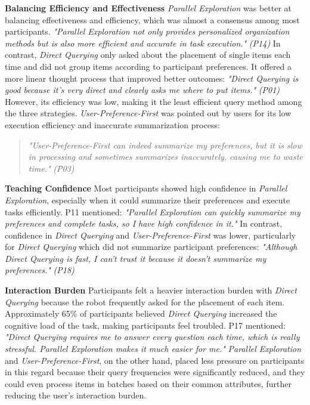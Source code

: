 \documentclass[sigconf,authordraft]{acmart}
\newcommand{\smallitalic}[1]{{\small\textit{#1}}}
\newcommand{\strategy}[1]{{\textit{#1}}}
\begin{document}
\textbf{Balancing Efficiency and Effectiveness}
\strategy{Parallel Exploration} was better at balancing effectiveness and efficiency, which was almost a consensus among most participants. \smallitalic{"Parallel Exploration not only provides personalized organization methods but is also more efficient and accurate in task execution."} \smallitalic{(P14)} In contrast, \strategy{Direct Querying} only asked about the placement of single items each time and did not group items according to participant preferences. It offered a more linear thought process that improved better outcomes: \smallitalic{"Direct Querying is good because it's very direct and clearly asks me where to put items."} \smallitalic{(P01)} However, its efficiency was low, making it the least efficient query method among the three strategies. \strategy{User-Preference-First} was pointed out by users for its low execution efficiency and inaccurate summarization process:
\begin{quote}
\smallitalic{"User-Preference-First can indeed summarize my preferences, but it is slow in processing and sometimes summarizes inaccurately, causing me to waste time."} \smallitalic{(P03)}
\end{quote}

\textbf{Teaching Confidence}
Most participants showed high confidence in \strategy{Parallel Exploration}, especially when it could summarize their preferences and execute tasks efficiently. P11 mentioned: \smallitalic{"Parallel Exploration can quickly summarize my preferences and complete tasks, so I have high confidence in it."} In contrast, confidence in \strategy{Direct Querying} and \strategy{User-Preference-First} was lower, particularly for \strategy{Direct Querying} which did not summarize participant preferences: \smallitalic{"Although Direct Querying is fast, I can't trust it because it doesn't summarize my preferences."} \smallitalic{(P18)}

\textbf{Interaction Burden}
Participants felt a heavier interaction burden with \strategy{Direct Querying} because the robot frequently asked for the placement of each item. Approximately 65\% of participants believed \strategy{Direct Querying} increased the cognitive load of the task, making participants feel troubled. P17 mentioned: \smallitalic{"Direct Querying requires me to answer every question each time, which is really stressful. Parallel Exploration makes it much easier for me."} \strategy{Parallel Exploration} and \strategy{User-Preference-First}, on the other hand, placed less pressure on participants in this regard because their query frequencies were significantly reduced, and they could even process items in batches based on their common attributes, further reducing the user's interaction burden.
\end{document}
